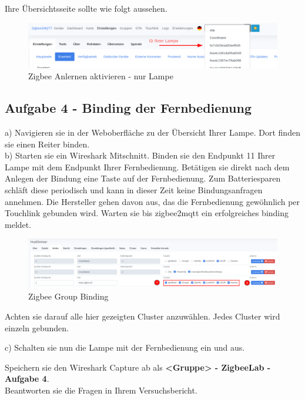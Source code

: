 Ihre Übersichtsseite sollte wie folgt aussehen.

\begin{figure}[H]
    \centering
    \includegraphics[width=1\textwidth]{media/Z2M-Anlernen-Lampe.png}
    \caption{Zigbee Anlernen aktivieren - nur Lampe}
\end{figure}


\subsection{Aufgabe 4 - Binding der Fernbedienung}

a) Navigieren sie in der Weboberfläche zu der Übersicht Ihrer Lampe. Dort finden sie einen Reiter \grqq binden\grqq{}. \\
b) Starten sie ein Wireshark Mitschnitt. Binden sie den Endpunkt 11 Ihrer Lampe mit dem Endpunkt Ihrer Fernbedienung. Betätigen sie direkt nach dem Anlegen der Bindung
eine Taste auf der Fernbedienung. Zum Batteriesparen \grqq schläft\grqq{} diese periodisch und kann in dieser Zeit keine Bindungsanfragen annehmen. Die Hersteller gehen davon
aus, das die Fernbedienung gewöhnlich per Touchlink gebunden wird. Warten sie bis zigbee2mqtt ein erfolgreiches binding meldet. \\

\begin{figure}[H]
    \centering
    \includegraphics[width=1\textwidth]{media/Z2M-Group-Binding.png}
    \caption{Zigbee Group Binding}
\end{figure}

Achten sie darauf alle hier gezeigten Cluster anzuwählen. Jedes Cluster wird einzeln gebunden.

c) Schalten sie nun die Lampe mit der Fernbedienung ein und aus. 

\begin{Hinweis}
    Speichern sie den Wireshark Capture ab als \textbf{\grqq <Gruppe> - ZigbeeLab - Aufgabe 4\grqq{}}. \\
    Beantworten sie die Fragen in Ihrem Versuchsbericht.
\end{Hinweis}


